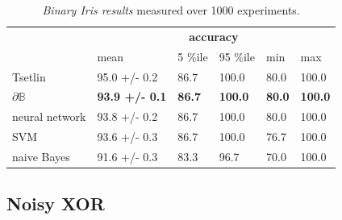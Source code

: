 \documentclass{article}
\theoremstyle{plain}
\theoremstyle{definition}
\theoremstyle{remark}
\begin{document}
\begin{table}[t]
	\centering
	\begin{tabular}{llllll}
		\cline{2-6}
		\multicolumn{1}{c}{}                       & \multicolumn{5}{c}{\textbf{accuracy}}                                                                                                                                                            \\ \cline{2-6} 
		\multicolumn{1}{l|}{}                      & \multicolumn{1}{l|}{mean}                  & \multicolumn{1}{l|}{5 \%ile}       & \multicolumn{1}{l|}{95 \%ile}       & \multicolumn{1}{l|}{min}           & \multicolumn{1}{l|}{max}            \\ \hline
		\multicolumn{1}{|l|}{Tsetlin}              & \multicolumn{1}{l|}{95.0 +/- 0.2}          & \multicolumn{1}{l|}{86.7}          & \multicolumn{1}{l|}{100.0}          & \multicolumn{1}{l|}{80.0}          & \multicolumn{1}{l|}{100.0}          \\ \hline
		\multicolumn{1}{|l|}{$\partial\mathbb{B}$} & \multicolumn{1}{l|}{\textbf{93.9 +/- 0.1}} & \multicolumn{1}{l|}{\textbf{86.7}} & \multicolumn{1}{l|}{\textbf{100.0}} & \multicolumn{1}{l|}{\textbf{80.0}} & \multicolumn{1}{l|}{\textbf{100.0}} \\ \hline
		\multicolumn{1}{|l|}{neural network}       & \multicolumn{1}{l|}{93.8 +/- 0.2}          & \multicolumn{1}{l|}{86.7}          & \multicolumn{1}{l|}{100.0}           & \multicolumn{1}{l|}{80.0}          & \multicolumn{1}{l|}{100.0}           \\ \hline
		\multicolumn{1}{|l|}{SVM}                  & \multicolumn{1}{l|}{93.6 +/- 0.3}          & \multicolumn{1}{l|}{86.7}          & \multicolumn{1}{l|}{100.0}           & \multicolumn{1}{l|}{76.7}          & \multicolumn{1}{l|}{100.0}           \\ \hline
		\multicolumn{1}{|l|}{naive Bayes}          & \multicolumn{1}{l|}{91.6 +/- 0.3}          & \multicolumn{1}{l|}{83.3}          & \multicolumn{1}{l|}{96.7}           & \multicolumn{1}{l|}{70.0}          & \multicolumn{1}{l|}{100.0}           \\ \hline
	\end{tabular}
	\caption{{\em Binary Iris results}  measured over 1000 experiments.}
	\label{tab:binary-iris-results}
\end{table}

\subsection{Noisy XOR}
\end{document}
